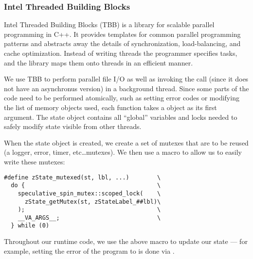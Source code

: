 
\subsubsection{Intel Threaded Building Blocks}
Intel Threaded Building Blocks\cite{reinders2007intel} (TBB) is a library for
scalable parallel
programming in C++. It provides templates for common parallel programming
patterns and abstracts away the details of synchronization, load-balancing,
and cache optimization. Instead of writing threads the programmer specifies
tasks, and the library maps them onto threads in an efficient manner.

We use TBB to perform parallel file I/O as well as invoking the
	 call (since it does not have an asynchronus version)
	in a background thread.
Since some parts of the code need to be performed atomically, such as
	setting error codes or modifying the list of memory objects used,
	each function takes a  object as its first argument.
The state object contains all ``global'' variables and locks needed to
	safely modify state visible from other threads.


When the state object is created, we create a set of mutexes that
	are to be reused (a logger, error, timer, etc\ldots mutexes).
We then use a macro to allow us to easily write these mutexes:

\begin{verbatim}
#define zState_mutexed(st, lbl, ...)        \
  do {                                      \
    speculative_spin_mutex::scoped_lock(    \
      zState_getMutex(st, zStateLabel_##lbl)\
    );                                      \
    __VA_ARGS__;                            \
  } while (0)
\end{verbatim}


Throughout our runtime code, we use the above macro to update our state ---
 	for example, setting the error of the program to  is done via .


